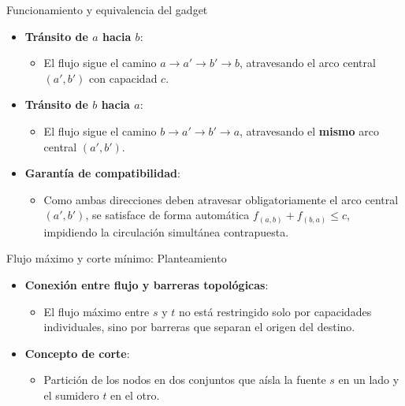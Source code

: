 \documentclass[
  ignorenonframetext,
]{beamer}
\providecommand{\tightlist}{%
  \setlength{\itemsep}{0pt}\setlength{\parskip}{0pt}}
\begin{document}
\begin{frame}{Funcionamiento y equivalencia del gadget}
\label{funcionamiento-y-equivalencia-del-gadget}
\begin{itemize}
\tightlist
\item
  \textbf{Tránsito de \(a\) hacia \(b\)}:

  \begin{itemize}
  \tightlist
  \item
    El flujo sigue el camino \(a \to a' \to b' \to b\), atravesando el
    arco central \((a', b')\) con capacidad \(c\).
  \end{itemize}
\item
  \textbf{Tránsito de \(b\) hacia \(a\)}:

  \begin{itemize}
  \tightlist
  \item
    El flujo sigue el camino \(b \to a' \to b' \to a\), atravesando el
    \textbf{mismo} arco central \((a', b')\).
  \end{itemize}
\item
  \textbf{Garantía de compatibilidad}:

  \begin{itemize}
  \tightlist
  \item
    Como ambas direcciones deben atravesar obligatoriamente el arco
    central \((a', b')\), se satisface de forma automática
    \(f_{(a,b)} + f_{(b,a)} \le c\), impidiendo la circulación
    simultánea contrapuesta.
  \end{itemize}
\end{itemize}
\end{frame}

\begin{frame}{Flujo máximo y corte mínimo: Planteamiento}
\label{flujo-muxe1ximo-y-corte-muxednimo-planteamiento}
\begin{itemize}
\tightlist
\item
  \textbf{Conexión entre flujo y barreras topológicas}:

  \begin{itemize}
  \tightlist
  \item
    El flujo máximo entre \(s\) y \(t\) no está restringido solo por
    capacidades individuales, sino por barreras que separan el origen
    del destino.
  \end{itemize}
\item
  \textbf{Concepto de corte}:

  \begin{itemize}
  \tightlist
  \item
    Partición de los nodos en dos conjuntos que aísla la fuente \(s\) en
    un lado y el sumidero \(t\) en el otro.
  \end{itemize}
\end{itemize}
\end{frame}
\end{document}
